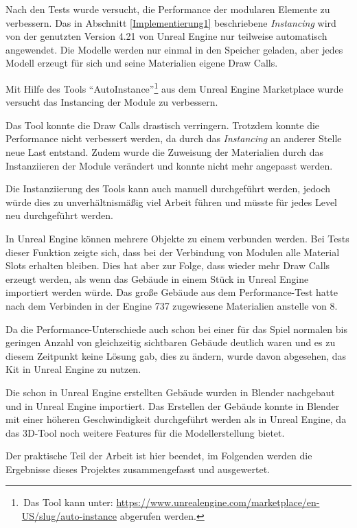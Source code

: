 \par
Nach den Tests wurde versucht, die Performance der modularen Elemente zu verbessern. Das in Abschnitt \ref{Implementierung1} beschriebene \textit{Instancing} wird von der genutzten Version 4.21 von Unreal Engine nur teilweise automatisch angewendet. Die Modelle werden nur einmal in den Speicher geladen, aber jedes Modell erzeugt für sich und seine Materialien eigene Draw Calls.
\par
Mit Hilfe des Tools \enquote{AutoInstance}\footnote{\,Das Tool kann unter: \url{https://www.unrealengine.com/marketplace/en-US/slug/auto-instance} abgerufen werden.} aus dem Unreal Engine Marketplace wurde versucht das Instancing der Module zu verbessern.
\par
Das Tool konnte die Draw Calls drastisch verringern. Trotzdem konnte die Performance nicht verbessert werden, da durch das \textit{Instancing} an anderer Stelle neue Last entstand. Zudem wurde die Zuweisung der Materialien durch das Instanziieren der Module verändert und konnte nicht mehr angepasst werden.
\par
Die Instanziierung des Tools kann auch manuell durchgeführt werden, jedoch würde dies zu unverhältnismäßig viel Arbeit führen und müsste für jedes Level neu durchgeführt werden.
\par
In Unreal Engine können mehrere Objekte zu einem verbunden werden. Bei Tests dieser Funktion zeigte sich, dass bei der Verbindung von Modulen alle Material Slots erhalten bleiben. Dies hat aber zur Folge, dass wieder mehr Draw Calls erzeugt werden, als wenn das Gebäude in einem Stück in Unreal Engine importiert werden würde. Das große Gebäude aus dem Performance-Test hatte nach dem Verbinden in der Engine 737 zugewiesene Materialien anstelle von 8.
\par
Da die Performance-Unterschiede auch schon bei einer für das Spiel normalen bis geringen Anzahl von gleichzeitig sichtbaren Gebäude deutlich waren und es zu diesem Zeitpunkt keine Lösung gab, dies zu ändern, wurde davon abgesehen, das Kit in Unreal Engine zu nutzen.
\par
Die schon in Unreal Engine erstellten Gebäude wurden in Blender nachgebaut und in Unreal Engine importiert. Das Erstellen der Gebäude konnte in Blender mit einer höheren Geschwindigkeit durchgeführt werden als in Unreal Engine, da das 3D-Tool noch weitere Features für die Modellerstellung bietet.
\par
Der praktische Teil der Arbeit ist hier beendet, im Folgenden werden die Ergebnisse dieses Projektes zusammengefasst und ausgewertet.
